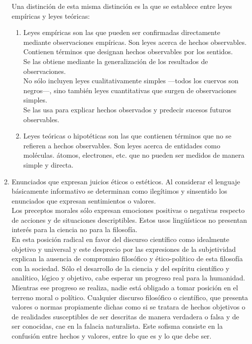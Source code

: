 \documentclass[a4paper, 11pt, twocolumn, spanish]{article}
\begin{document}
\begin{enumerate}
Una distinción de esta misma distinción es la que se establece
entre leyes empíricas y leyes teóricas:
\begin{enumerate}
\item Leyes empíricas son las que pueden ser confirmadas
directamente mediante observaciones empíricas. Son leyes
acerca de hechos observables. Contienen términos que designan
hechos observables por los sentidos.\\
Se las obtiene mediante la generalización de los resultados
de observaciones.\\
No sólo incluyen leyes cualitativamente simples —todos los
cuervos son negros—, sino también leyes cuantitativas que
surgen de observaciones simples.\\
Se las usa para explicar hechos observados y predecir sucesos
futuros observables.
\item Leyes teóricas o hipotéticas son las que contienen términos
que no se refieren a hechos observables. Son leyes acerca de
entidades como moléculas. átomos, electrones, etc. que no
pueden ser medidos de manera simple y directa.
\end{enumerate}

\item Enunciados que expresan juicios éticos o estéticos. Al considerar
el lenguaje básicamente informativo se determinan como ilegítimos
y sinsentido los enunciados que expresan sentimientos o
valores.\\
Los preceptos morales sólo expresan emociones positivas o
negativas respecto de acciones y de situaciones
descriptibles. Estos usos lingüísticos no presentan interés para
la ciencia no para la filosofía.\\

En esta posición radical en favor del discurso científico como
idealmente objetivo y universal y este desprecio por las
expresiones de la subjetividad explican la ausencia de compromiso
filosófico y ético-político de esta filosofía con la
sociedad. Sólo el desarrollo de la ciencia y del espíritu
científico y analítico, lógico y objetivo, cabe esperar un
progreso real para la humanidad. Mientras ese progreso se
realiza, nadie está obligado a tomar posición en el terreno moral
o político. Cualquier discurso filosófico o científico, que
presenta valores o normas propiamente dichas como si se tratara
de hechos objetivos o de realidades susceptibles de ser descritas
de manera verdadera o falsa y de ser conocidas, cae en la falacia
naturalista. Este sofisma consiste en la confusión entre hechos y
valores, entre lo que es y lo que debe ser.
\end{enumerate}
\end{document}
